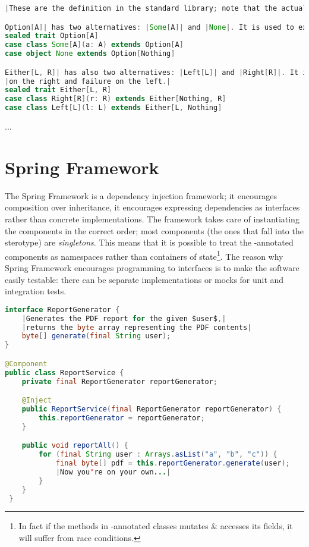 \documentclass[10 pt]{article}
\begin{document}
\begin{lstlisting}[caption={Pattern matching in stdlib}, label={code:pm4}, language=Scala, escapechar=|]
|These are the definition in the standard library; note that the actual definitions are more complex, but this code expresses the essence.|

Option[A]| has two alternatives: |Some[A]| and |None|. It is used to express one-or-missing values.|
sealed trait Option[A]
case class Some[A](a: A) extends Option[A]
case object None extends Option[Nothing]

Either[L, R]| has also two alternatives: |Left[L]| and |Right[R]|. It is used to express success or failure, with success by convention|
|on the right and failure on the left.|
sealed trait Either[L, R]
case class Right[R](r: R) extends Either[Nothing, R]
case class Left[L](l: L) extends Either[L, Nothing]
\end{lstlisting}

...


\section{Spring Framework}
The Spring Framework is a dependency injection framework; it encourages composition over inheritance, it encourages expressing dependencies as interfaces rather than concrete implementations. The framework takes care of instantiating the components in the correct order; most components (the ones that fall into the  sterotype) are \emph{singletons}. This means that it is possible to treat the -annotated components as namespaces rather than containers of state\footnote{In fact if the methods in -annotated classes mutates \& accesses its fields, it will suffer from race conditions.}. The reason why Spring Framework encourages programming to interfaces is to make the software easily testable: there can be separate implementations or mocks for unit and integration tests.

\begin{lstlisting}[caption={Components}, label={code:sf1-java}, language=Java, escapechar=|]
interface ReportGenerator {
    |Generates the PDF report for the given $user$,|
    |returns the byte array representing the PDF contents|
    byte[] generate(final String user);
}

@Component
public class ReportService {
    private final ReportGenerator reportGenerator;

    @Inject
    public ReportService(final ReportGenerator reportGenerator) {
        this.reportGenerator = reportGenerator;
    }

    public void reportAll() {
        for (final String user : Arrays.asList("a", "b", "c")) {
            final byte[] pdf = this.reportGenerator.generate(user);
            |Now you're on your own...|
        }
    }
 }
\end{lstlisting}
\end{document}
